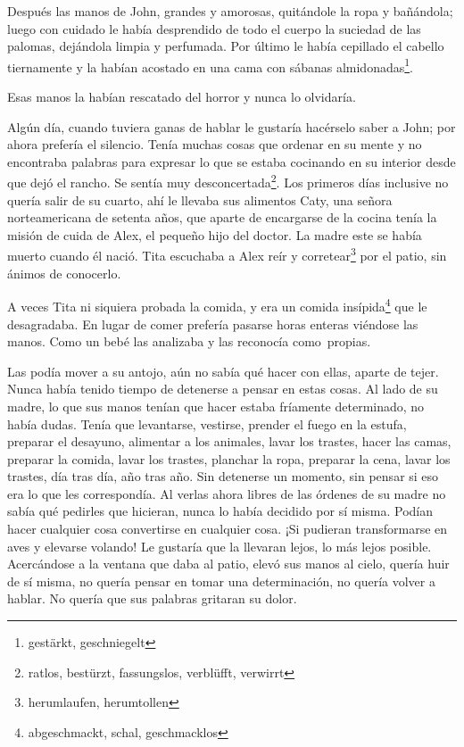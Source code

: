Después las manos de John, grandes y amorosas, quitándole la ropa y
bañándola; luego con cuidado le había desprendido de todo el cuerpo la
suciedad de las palomas, dejándola limpia y perfumada. Por último le
había cepillado el cabello tiernamente y la habían acostado en una cama
con sábanas almidonadas\footnote{gestärkt, geschniegelt}.

Esas manos la habían rescatado del horror y nunca lo olvidaría.

Algún día, cuando tuviera ganas de hablar le gustaría hacérselo saber a
John; por ahora prefería el silencio. Tenía muchas cosas que ordenar en
su mente y no encontraba palabras para expresar lo que se estaba
cocinando en su interior desde que dejó el rancho. Se sentía muy desconcertada\footnote{ratlos, bestürzt, fassungslos, verblüfft, verwirrt}.
Los primeros días inclusive no quería salir de su cuarto,
ahí le llevaba sus alimentos Caty, una señora norteamericana de setenta años,
que aparte de encargarse de la cocina tenía la misión de cuida de Alex,
el pequeño hijo del doctor. La madre este se había muerto cuando él
nació. Tita escuchaba a Alex reír y corretear\footnote{herumlaufen, herumtollen}
por el patio, sin ánimos de conocerlo.

A veces Tita ni siquiera probada la comida, y era un comida insípida\footnote{abgeschmackt, schal, geschmacklos}
que le desagradaba. En lugar de comer prefería pasarse horas enteras
viéndose las manos. Como un bebé las analizaba y las reconocía como~propias.

Las podía mover a su antojo, aún no sabía qué hacer con ellas, aparte de
tejer. Nunca había tenido tiempo de detenerse a pensar en estas cosas.
Al lado de su madre, lo que sus manos tenían que hacer estaba fríamente
determinado, no había dudas. Tenía que levantarse, vestirse, prender el
fuego en la estufa, preparar el desayuno, alimentar a los animales,
lavar los trastes, hacer las camas, preparar la comida, lavar los
trastes, planchar la ropa, preparar la cena, lavar los trastes, día tras
día, año tras año. Sin detenerse un momento, sin pensar si eso era lo
que les correspondía. Al verlas ahora libres de las órdenes de su madre
no sabía qué pedirles que hicieran, nunca lo había decidido por sí
misma. Podían hacer cualquier cosa convertirse en cualquier cosa. ¡Si
pudieran transformarse en aves y elevarse volando! Le gustaría que la
llevaran lejos, lo más lejos posible. Acercándose a la ventana que
daba al patio, elevó sus manos al cielo, quería huir de sí misma, no
quería pensar en tomar una determinación, no quería volver a hablar. No
quería que sus palabras gritaran su dolor.

